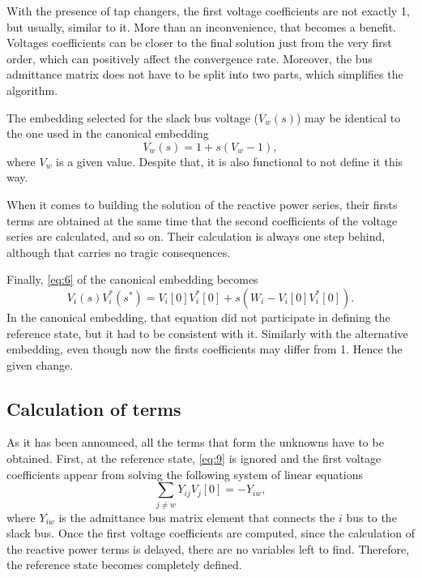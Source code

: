 \documentclass[conference]{IEEEtran}
\begin{document}
With the presence of tap changers, the first voltage coefficients are not exactly 1, but usually, similar to it. More than an inconvenience, that becomes a benefit. Voltages coefficients can be closer to the final solution just from the very first order, which can positively affect the convergence rate. Moreover, the bus admittance matrix does not have to be split into two parts, which simplifies the algorithm.

The embedding selected for the slack bus voltage ($V_w(s)$) may be identical to the one used in the canonical embedding
\begin{equation}
  V_w(s)=1+s(V_w-1),
  \label{eq:8}
\end{equation}
where $V_w$ is a given value. Despite that, it is also functional to not define it this way.

When it comes to building the solution of the reactive power series, their firsts terms are obtained at the same time that the second coefficients of the voltage series are calculated, and so on. Their calculation is always one step behind, although that carries no tragic consequences. 

Finally, \eqref{eq:6} of the canonical embedding becomes
\begin{equation}
  V_i(s)V^*_i(s^*)=V_i[0]V^*_i[0]+s(W_i-V_i[0]V^*_i[0]).\label{eq:9}
\end{equation}
In the canonical embedding, that equation did not participate in defining the reference state, but it had to be consistent with it. Similarly with the alternative embedding, even though now the firsts coefficients may differ from 1. Hence the given change.

\subsection{Calculation of terms} 
As it has been announced, all the terms that form the unknowns have to be obtained. First, at the reference state, \eqref{eq:9} is ignored and the first voltage coefficients appear from solving the following system of linear equations
\begin{equation}
  \sum_{j\neq w}Y_{ij}V_j[0]=-Y_{iw},\label{eq:11}
\end{equation}
where $Y_{iw}$ is the admittance bus matrix element that connects the $i$ bus to the slack bus. Once the first voltage coefficients are computed, since the calculation of the reactive power terms is delayed, there are no variables left to find. Therefore, the reference state becomes completely defined.
\end{document}
